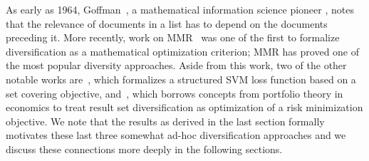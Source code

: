 As early as 1964, Goffman~\cite{goffman64OnRelevanceAsAMeasure}, a
mathematical information science pioneer \cite{harmon08RememberingWG},
notes that the relevance of documents in a list has to depend on the
documents preceding it.  More recently, work on
MMR~\cite{carbonell98MMR} was one of the first to formalize
diversification as a mathematical optimization criterion; MMR has
proved one of the most popular diversity approaches.  Aside from this
work, two of the other notable works are~\cite{yue081224Predicting},
which formalizes a structured SVM loss function based on a set
covering objective, and~\cite{wang09PortfolioTheory}, which borrows
concepts from portfolio theory in economics to treat result set
diversification as optimization of a risk minimization objective.  We
note that the results as derived in the last section formally motivates these
last three somewhat ad-hoc diversification approaches and we discuss
these connections more deeply in the following sections.


